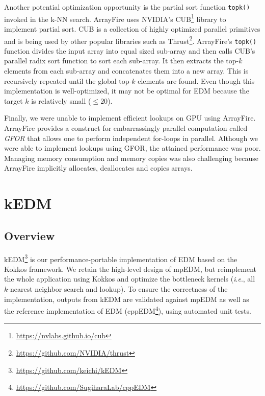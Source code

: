\documentclass[sigconf]{acmart}
\begin{document}
Another potential optimization opportunity is the partial sort function
\texttt{topk()} invoked in the k-NN search. ArrayFire uses NVIDIA's
CUB\footnote{\url{https://nvlabs.github.io/cub}} library to implement partial
sort. CUB is a collection of highly optimized parallel primitives and is being
used by other popular libraries such
as Thrust\footnote{\url{https://github.com/NVIDIA/thrust}}. ArrayFire's
\texttt{topk()} function divides the input array into equal sized sub-array
and then calls CUB's parallel radix sort function to sort each sub-array. It
then extracts the top-$k$ elements from each sub-array and concatenates them
into a new array. This is recursively repeated until the global top-$k$
elements are found. Even though this implementation is well-optimized, it may
not be optimal for EDM because the target $k$ is relatively small ($\leq 20$).

Finally, we were unable to implement efficient lookups on GPU using ArrayFire.
ArrayFire provides a construct for embarrassingly parallel computation called
\textit{GFOR} that allows one to perform independent for-loops in parallel.
Although we were able to implement lookups using GFOR, the attained
performance was poor. Managing memory consumption and memory copies was also
challenging because ArrayFire implicitly allocates, deallocates and copies
arrays.

\section{kEDM}\label{sec:proposal}


\subsection{Overview}

kEDM\footnote{\url{https://github.com/keichi/kEDM}} is our
performance-portable implementation of EDM based on the Kokkos framework. We retain the high-level design of mpEDM, but
reimplement the whole application using Kokkos and optimize the bottleneck kernels
(\textit{i}.\textit{e}., all $k$-nearest neighbor search and lookup). To ensure the correctness of the
implementation, outputs from kEDM are validated against mpEDM as well as
the reference implementation of EDM
(cppEDM\footnote{\url{https://github.com/SugiharaLab/cppEDM}}), using automated unit tests.
\end{document}
